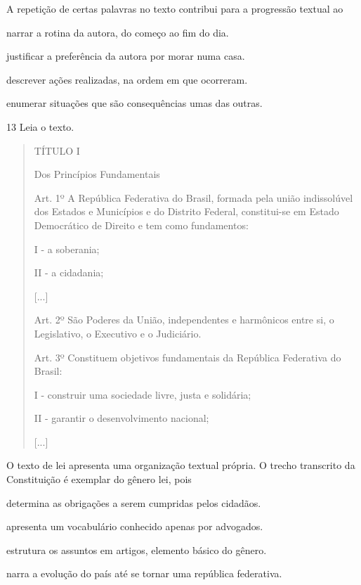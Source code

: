 A repetição de certas palavras no texto contribui para a progressão textual ao

\begin{escolha}
\item narrar a rotina da autora, do começo ao fim do dia.

\item justificar a preferência da autora por morar numa casa.

\item descrever ações realizadas, na ordem em que ocorreram.

\item enumerar situações que são consequências umas das outras.
\end{escolha}

\num{13} Leia o texto.

\begin{quote}
TÍTULO I

Dos Princípios Fundamentais

Art. 1º A República Federativa do Brasil, formada pela união
indissolúvel dos Estados e Municípios e do Distrito Federal,
constitui-se em Estado Democrático de Direito e tem como fundamentos:

I - a soberania;

II - a cidadania;

{[}...{]}

Art. 2º São Poderes da União, independentes e harmônicos entre si, o
Legislativo, o Executivo e o Judiciário.

Art. 3º Constituem objetivos fundamentais da República Federativa do
Brasil:

I - construir uma sociedade livre, justa e solidária;

II - garantir o desenvolvimento nacional;

{[}...{]}

\end{quote}

O texto de lei apresenta uma organização textual própria. O trecho transcrito da Constituição é exemplar do gênero lei, pois

\begin{escolha}
\item determina as obrigações a serem cumpridas pelos cidadãos.

\item apresenta um vocabulário conhecido apenas por advogados.

\item estrutura os assuntos em artigos, elemento básico do gênero.

\item narra a evolução do país até se tornar uma república federativa.
\end{escolha}

